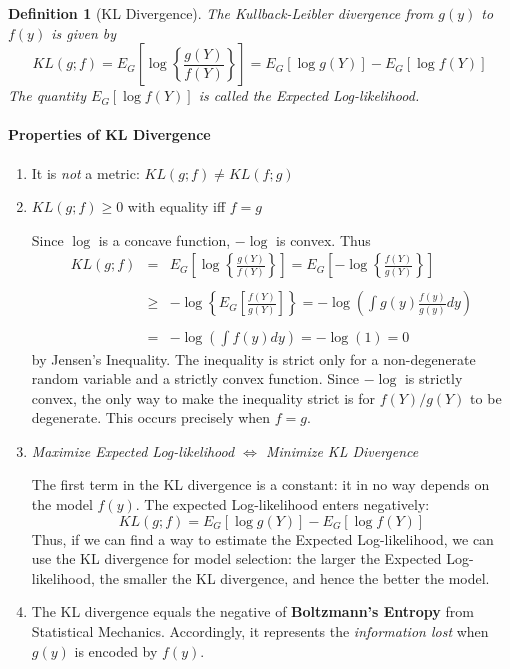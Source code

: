 \documentclass[12pt]{article}
\newtheorem{defn}{Definition}[section]
\theoremstyle{definition}
\begin{document}
\begin{defn}[KL Divergence]
The Kullback-Leibler divergence from $g(y)$ to $f(y)$ is given by
	$$KL(g;f) = E_G \left[ \log{\left\{\frac{g(Y)}{f(Y)}\right\}}\right]= E_G\left[ \log{g(Y)}\right] - E_G\left[ \log{f(Y)} \right]$$
The quantity $E_G\left[ \log{f(Y)} \right]$ is called the Expected Log-likelihood.
\end{defn}

\paragraph{Properties of KL Divergence}
	\begin{enumerate}
		\item It is \emph{not} a metric: $KL(g;f) \neq KL(f;g)$
		\item $KL(g;f) \geq 0$ with equality iff $f=g$
		
		Since $\log$ is a concave function, $-\log$ is convex. Thus
			\begin{eqnarray*}
			KL(g;f) &=&  E_G \left[ \log{\left\{\frac{g(Y)}{f(Y)}\right\}}\right] = E_G \left[- \log{\left\{\frac{f(Y)}{g(Y)}\right\}}\right]\\\\
				&\geq& -\log{\left\{E_G\left[ \frac{f(Y)}{g(Y)} \right]\right\}} = -\log{\left(\int g(y) \frac{f(y)}{g(y)} dy  \right)}\\\\
				&=&  -\log{\left(\int f(y) dy  \right)} = -\log{(1)} = 0
			\end{eqnarray*} 
		by Jensen's Inequality. The inequality is strict only for a non-degenerate random variable and a strictly convex function. Since $-\log$ is strictly convex, the only way to make the inequality strict is for $f(Y)/g(Y)$ to be degenerate. This occurs precisely when $f=g$.
		
		\item \emph{Maximize Expected Log-likelihood $\iff$ Minimize KL Divergence}
		
		The first term in the KL divergence is a constant: it in no way depends on the model $f(y)$. The expected Log-likelihood enters negatively:
		$$KL(g;f) = E_G\left[ \log{g(Y)}\right] - E_G\left[ \log{f(Y)} \right]$$ 
		Thus, if we can find a way to estimate the Expected Log-likelihood, we can use the KL divergence for model selection: the larger the Expected Log-likelihood, the smaller the KL divergence, and hence the better the model.
		
		\item The KL divergence equals the negative of \textbf{Boltzmann's Entropy} from Statistical Mechanics. Accordingly, it represents the \emph{information lost} when $g(y)$ is encoded by $f(y)$.
	\end{enumerate}
\end{document}
